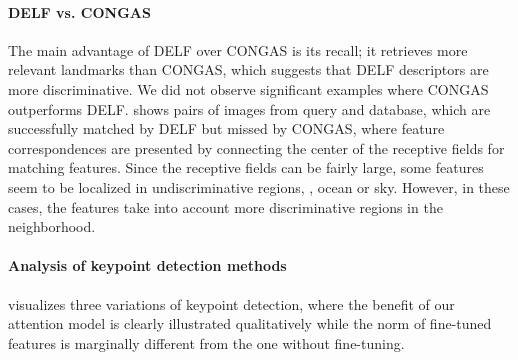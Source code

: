 \documentclass[10pt,twocolumn,letterpaper]{article}
\begin{document}
\vspace{-3pt}
\paragraph{DELF vs. CONGAS}
\iffalse
\figref{fig:feat_matches} presents query-database pairs which are successful DELF matches, missed by CONGAS.
DELF's main improvement over CONGAS is in terms of recall: it is able to retrieve many more relevant landmarks compared to CONGAS.
This suggests that DELF descriptors are more discriminative.
We did not observe significant examples where CONGAS outperforms DELF, so we do not include such examples here.

In \figref{fig:feat_matches}, we present feature correspondences by connecting the center of the receptive fields for matching features.
Note that the receptive fields can be quite large.
This explains why some features seem to be localized in undiscriminative regions (\eg, in the ocean or in the sky) -- in these cases, the features are extracted from large patches, which take into account more discriminative regions in its neighborhood.
\fi
The main advantage of DELF over CONGAS is its recall; it retrieves more relevant landmarks than CONGAS, which suggests that DELF descriptors are more discriminative.
We did not observe significant examples where CONGAS outperforms DELF.
 shows pairs of images from query and database, which are successfully matched by DELF but missed by CONGAS, where feature correspondences are presented by connecting the center of the receptive fields for matching features.
Since the receptive fields can be fairly large, some features seem to be localized in undiscriminative regions, \eg, ocean or sky.
However, in these cases, the features take into account more discriminative regions in the neighborhood.


\vspace{-7pt}
\paragraph{Analysis of keypoint detection methods}
 visualizes three variations of keypoint detection, where the benefit of our attention model is clearly illustrated qualitatively while the  norm of fine-tuned features is marginally different from the one without fine-tuning.



\iffalse
\end{document}
